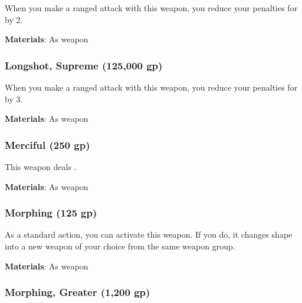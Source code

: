 When you make a ranged attack with this weapon, you reduce your penalties for  by 2.



\vspace{0.25em}
\textbf{Materials}: As weapon


\lowercase{\hypertarget{item:Longshot, Supreme}{}}\label{item:Longshot, Supreme}
\hypertarget{item:Longshot, Supreme}{\subsubsection{Longshot, Supreme\hfill{} (125,000 gp)}}

When you make a ranged attack with this weapon, you reduce your penalties for  by 3.



\vspace{0.25em}
\textbf{Materials}: As weapon


\lowercase{\hypertarget{item:Merciful}{}}\label{item:Merciful}
\hypertarget{item:Merciful}{\subsubsection{Merciful\hfill{} (250 gp)}}

This weapon deals .



\vspace{0.25em}
\textbf{Materials}: As weapon


\lowercase{\hypertarget{item:Morphing}{}}\label{item:Morphing}
\hypertarget{item:Morphing}{\subsubsection{Morphing\hfill{} (125 gp)}}

As a standard action, you can activate this weapon.
If you do, it changes shape into a new weapon of your choice from the same weapon group.



\vspace{0.25em}
\textbf{Materials}: As weapon


\lowercase{\hypertarget{item:Morphing, Greater}{}}\label{item:Morphing, Greater}
\hypertarget{item:Morphing, Greater}{\subsubsection{Morphing, Greater\hfill{} (1,200 gp)}}

